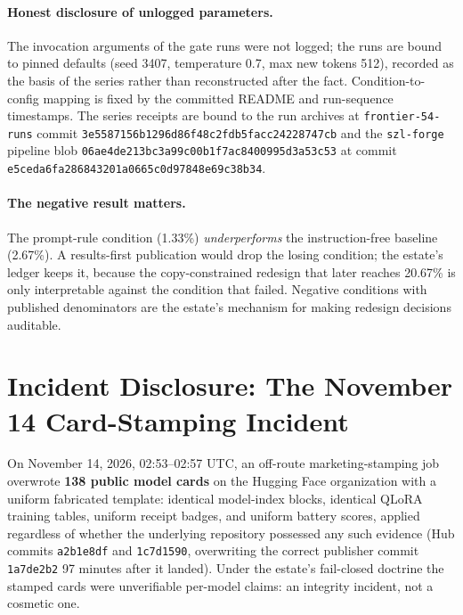 ﻿\documentclass[11pt]{article}
\begin{document}
\paragraph{Honest disclosure of unlogged parameters.} The invocation arguments of the gate runs were not logged; the runs are bound to pinned defaults (seed 3407, temperature 0.7, max new tokens 512), recorded as the basis of the series rather than reconstructed after the fact. Condition-to-config mapping is fixed by the committed README and run-sequence timestamps. The series receipts are bound to the run archives at \texttt{frontier-54-runs} commit \texttt{3e5587156b1296d86f48c2fdb5facc24228747cb} and the \texttt{szl-forge} pipeline blob \texttt{06ae4de213bc3a99c00b1f7ac8400995d3a53c53} at commit \texttt{e5ceda6fa286843201a0665c0d97848e69c38b34}.

\paragraph{The negative result matters.} The prompt-rule condition (1.33\%) \emph{underperforms} the instruction-free baseline (2.67\%). A results-first publication would drop the losing condition; the estate's ledger keeps it, because the copy-constrained redesign that later reaches 20.67\% is only interpretable against the condition that failed. Negative conditions with published denominators are the estate's mechanism for making redesign decisions auditable.

\section{Incident Disclosure: The November 14 Card-Stamping Incident}
\label{sec:incident}

On November 14, 2026, 02:53--02:57 UTC, an off-route marketing-stamping job overwrote \textbf{138 public model cards} on the Hugging Face organization with a uniform fabricated template: identical model-index blocks, identical QLoRA training tables, uniform receipt badges, and uniform battery scores, applied regardless of whether the underlying repository possessed any such evidence (Hub commits \texttt{a2b1e8df} and \texttt{1c7d1590}, overwriting the correct publisher commit \texttt{1a7de2b2} 97 minutes after it landed). Under the estate's fail-closed doctrine the stamped cards were unverifiable per-model claims: an integrity incident, not a cosmetic one.
\end{document}
